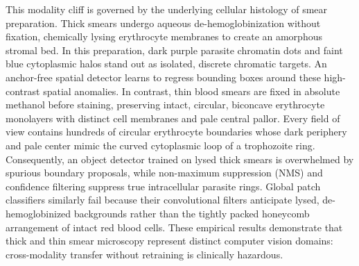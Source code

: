 \documentclass[a4paper,11pt]{article}
\begin{document}
This modality cliff is governed by the underlying cellular histology of smear preparation. Thick smears undergo aqueous de-hemoglobinization without fixation, chemically lysing erythrocyte membranes to create an amorphous stromal bed. In this preparation, dark purple parasite chromatin dots and faint blue cytoplasmic halos stand out as isolated, discrete chromatic targets. An anchor-free spatial detector learns to regress bounding boxes around these high-contrast spatial anomalies.
In contrast, thin blood smears are fixed in absolute methanol before staining, preserving intact, circular, biconcave erythrocyte monolayers with distinct cell membranes and pale central pallor. Every field of view contains hundreds of circular erythrocyte boundaries whose dark periphery and pale center mimic the curved cytoplasmic loop of a trophozoite ring. Consequently, an object detector trained on lysed thick smears is overwhelmed by spurious boundary proposals, while non-maximum suppression (NMS) and confidence filtering suppress true intracellular parasite rings. Global patch classifiers similarly fail because their convolutional filters anticipate lysed, de-hemoglobinized backgrounds rather than the tightly packed honeycomb arrangement of intact red blood cells. These empirical results demonstrate that thick and thin smear microscopy represent distinct computer vision domains: cross-modality transfer without retraining is clinically hazardous.
\end{document}
